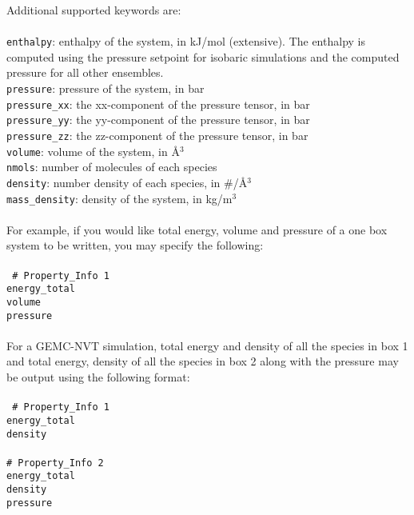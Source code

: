 Additional supported keywords are: \\ \\
\texttt{enthalpy}: enthalpy of the system, in kJ/mol (extensive).
The enthalpy is computed using the pressure setpoint for isobaric simulations and
the computed pressure for all other ensembles. \\
\texttt{pressure}: pressure of the system, in bar \\
\texttt{pressure\_xx}: the xx-component of the pressure tensor, in bar \\
\texttt{pressure\_yy}: the yy-component of the pressure tensor, in bar \\
\texttt{pressure\_zz}: the zz-component of the pressure tensor, in bar \\
\texttt{volume}: volume of the system, in \AA$^3$ \\
\texttt{nmols}: number of molecules of each species \\
\texttt{density}: number density of each species, in \#/\AA$^3$ \\
\texttt{mass\_density}: density of the system, in kg/m$^3$ \\ \\
%
For example, if you would like total energy, volume and pressure of a one box system to be written, you may
specify the following: \\ \\
%
\texttt{
\# Property\_Info 1 \\
energy\_total \\
volume \\
pressure \\ \\}
%
For a GEMC-NVT simulation, total energy and density of all the species in box 1 and total energy, density of
all the species in box 2 along with the pressure may be output using the following format: \\ \\
%
\texttt{
\# Property\_Info 1 \\
energy\_total \\
density \\ \\
%
\# Property\_Info 2 \\
energy\_total \\
density \\
pressure }
%
%
%
